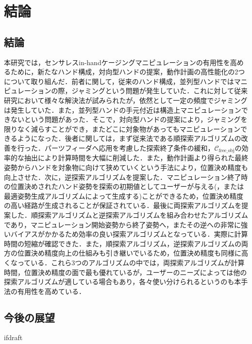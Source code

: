 \documentclass[a4paper,twoside,12pt,papersize, dvipdfmx]{iirthesis}
\begin{document}
    \newcommand{\figref}[1]{\figurename\ref{#1}}
    \newcommand{\tabref}[1]{\tablename\ref{#1}}
    \renewcommand{\eqref}[1]{式~(\ref{#1})}
    \newcommand{\chapref}[1]{\ref{#1}章}
    \newcommand{\secref}[1]{\ref{#1}節}
    \newcommand{\ssecref}[1]{\ref{#1}項}
    \newcommand{\appref}[1]{付録\ref{#1}}
\fi

\minitoc

\chapter{結論}\label{chap:conclusion}
\section{結論}\label{sec:conclusion:conclusion}
本研究では，センサレスin-handケージングマニピュレーションの有用性を高めるために，新たなハンド構成，対向型ハンドの提案，動作計画の高性能化の2つについて取り組んだ．前者に関して，従来のハンド構成，並列型ハンドではマニピュレーションの際，ジャミングという問題が発生していた．これに対して従来研究において様々な解決法が試みられたが，依然として一定の頻度でジャミングは発生していた．また，並列型ハンドの手元付近は構造上マニピュレーションできないという問題があった．そこで，対向型ハンドの提案により，ジャミングを限りなく減らすことができ，またどこに対象物があってもマニピュレーションできるようになった．後者に関しては，まず従来法である順探索アルゴリズムの改善を行った．パーツフィーダへ応用を考慮した探索終了条件の緩和，$\mathcal{C}_{\mathrm{free\_obj}}$の効率的な抽出により計算時間を大幅に削減した．また，動作計画より得られた最終姿勢からハンドを対象物に向けて狭めていくという手法により，位置決め精度も向上させた．次に，逆探索アルゴリズムを提案した．マニピュレーション終了時の位置決めされたハンド姿勢を探索の初期値としてユーザーが与える(，または最適姿勢生成アルゴリズムによって生成する)ことができるため，位置決め精度の高い経路が生成されることが保証されている．最後に両探索アルゴリズムを提案した．順探索アルゴリズムと逆探索アルゴリズムを組み合わせたアルゴリズムであり，マニピュレーション開始姿勢から終了姿勢へ，またその逆への非常に強いバイアスがかかるため効率の良い探索アルゴリズムとなっている．実際に計算時間の短縮が確認できた．また，順探索アルゴリズム，逆探索アルゴリズムの両方の位置決め精度向上の仕組みも引き継いでいるため，位置決め精度も同様に高くなっている．これら3つのアルゴリズムの中では，両探索アルゴリズムが計算時間，位置決め精度の面で最も優れているが，ユーザーのニーズによっては他の探索アルゴリズムが適している場合もあり，各々使い分けられるというのも本手法の有用性を高めている．\par



\section{今後の展望}\label{sec:conclusion:future}



\expandafter\ifx\csname ifdraft\endcsname\relax
    
\end{document}
